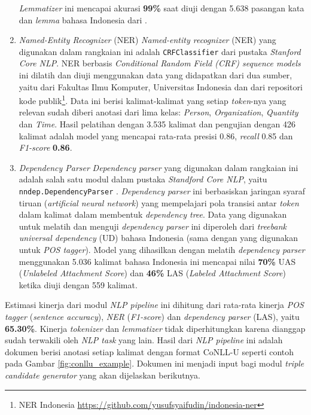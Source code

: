 \begin{enumerate}
\textit{Lemmatizer} ini mencapai akurasi \textbf{99\%} saat diuji dengan 5.638 pasangan kata dan \textit{lemma} bahasa Indonesia dari \cite{suhartono2014lemmatization}.

\item \textit{Named-Entity Recognizer} (NER)
\textit{Named-entity recognizer} (NER) yang digunakan dalam rangkaian ini adalah \verb|CRFClassifier| \citep{finkel2005incorporating} dari pustaka \textit{Stanford Core NLP}. NER berbasis \textit{Conditional Random Field (CRF) sequence models} ini dilatih dan diuji menggunakan data yang didapatkan dari dua sumber, yaitu dari Fakultas Ilmu Komputer, Universitas Indonesia dan dari repositori kode publik\footnote{NER Indonesia \url{https://github.com/yusufsyaifudin/indonesia-ner}}. Data ini berisi kalimat-kalimat yang setiap \textit{token}-nya yang relevan sudah diberi anotasi dari lima kelas: \textit{Person}, \textit{Organization}, \textit{Quantity} dan \textit{Time}. Hasil pelatihan dengan 3.535 kalimat dan pengujian dengan 426 kalimat adalah model yang mencapai rata-rata presisi 0.86, \textit{recall} 0.85 dan \textit{F1-score} \textbf{0.86}.

\item \textit{Dependency Parser}
\textit{Dependency parser} yang digunakan dalam rangkaian ini adalah salah satu modul dalam pustaka \textit{Standford Core NLP}, yaitu \verb|nndep.DependencyParser| \citep{chen2014fast}. \textit{Dependency parser} ini berbasiskan jaringan syaraf tiruan (\textit{artificial neural network}) yang mempelajari pola transisi antar \textit{token} dalam kalimat dalam membentuk \textit{dependency tree}. Data yang digunakan untuk melatih dan menguji \textit{dependency parser} ini diperoleh dari \textit{treebank} \textit{universal dependency} (UD) bahasa Indonesia (sama dengan yang digunakan untuk \textit{POS tagger}). Model yang dihasilkan dengan melatih \textit{dependency parser} menggunakan 5.036 kalimat bahasa Indonesia ini mencapai nilai \textbf{70\%} UAS (\textit{Unlabeled Attachment Score}) dan \textbf{46\%} LAS (\textit{Labeled Attachment Score}) ketika diuji dengan 559 kalimat.

\end{enumerate}

Estimasi kinerja dari modul \textit{NLP pipeline} ini dihitung dari rata-rata kinerja \textit{POS tagger} (\textit{sentence accuracy}), \textit{NER} (\textit{F1-score}) dan \textit{dependency parser} (LAS), yaitu \textbf{65.30\%}. Kinerja \textit{tokenizer} dan \textit{lemmatizer} tidak diperhitungkan karena dianggap sudah terwakili oleh \textit{NLP task} yang lain. Hasil dari \textit{NLP pipeline} ini adalah dokumen berisi anotasi setiap kalimat dengan format CoNLL-U seperti contoh pada Gambar \ref{fig:conllu_example}. Dokumen ini menjadi input bagi modul \textit{triple candidate generator} yang akan dijelaskan berikutnya. 

